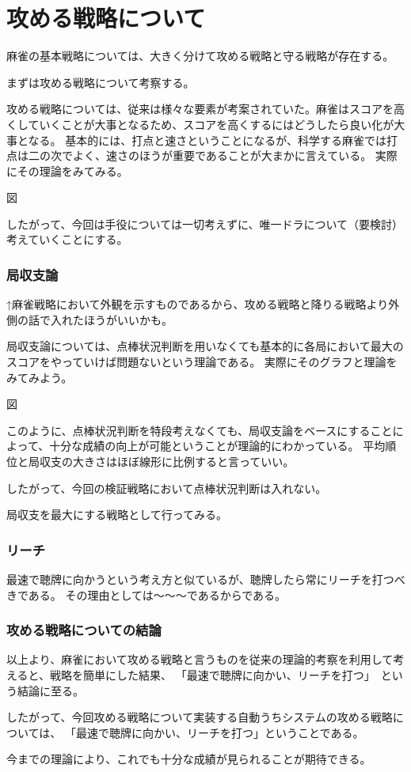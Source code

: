 \chapter{攻める戦略について}

麻雀の基本戦略については、大きく分けて攻める戦略と守る戦略が存在する。

まずは攻める戦略について考察する。

攻める戦略については、従来は様々な要素が考案されていた。麻雀はスコアを高くしていくことが大事となるため、スコアを高くするにはどうしたら良い化が大事となる。
基本的には、打点と速さということになるが、科学する麻雀では打点は二の次でよく、速さのほうが重要であることが大まかに言えている。
実際にその理論をみてみる。

図

したがって、今回は手役については一切考えずに、唯一ドラについて（要検討）考えていくことにする。


\subsection{局収支論}

↑麻雀戦略において外観を示すものであるから、攻める戦略と降りる戦略より外側の話で入れたほうがいいかも。

局収支論については、点棒状況判断を用いなくても基本的に各局において最大のスコアをやっていけば問題ないという理論である。
実際にそのグラフと理論をみてみよう。

図

このように、点棒状況判断を特段考えなくても、局収支論をベースにすることによって、十分な成績の向上が可能ということが理論的にわかっている。
平均順位と局収支の大きさはほぼ線形に比例すると言っていい。

したがって、今回の検証戦略において点棒状況判断は入れない。

局収支を最大にする戦略として行ってみる。

\subsection{リーチ}
最速で聴牌に向かうという考え方と似ているが、聴牌したら常にリーチを打つべきである。
その理由としては〜〜〜であるからである。


\subsection{攻める戦略についての結論}

以上より、麻雀において攻める戦略と言うものを従来の理論的考察を利用して考えると、戦略を簡単にした結果、
「最速で聴牌に向かい、リーチを打つ」　という結論に至る。

したがって、今回攻める戦略について実装する自動うちシステムの攻める戦略については、
「最速で聴牌に向かい、リーチを打つ」ということである。

今までの理論により、これでも十分な成績が見られることが期待できる。